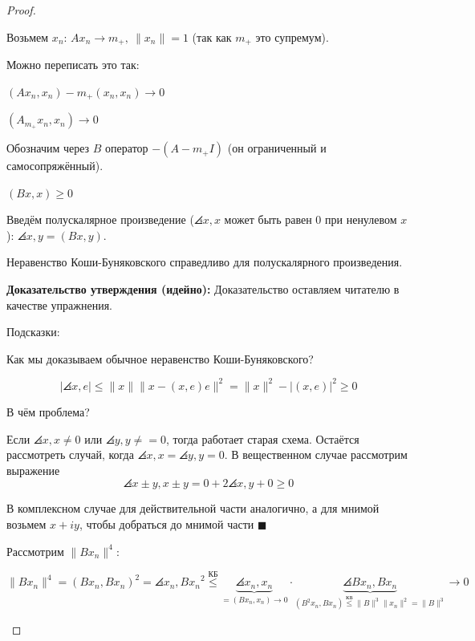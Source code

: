 \begin{proof}
\begin{itemize}
\begin{itemize}
            Возьмем $x_n$: $Ax_n \to m_+, \: \|x_n\| = 1$ (так как $m_+$ это супремум). 

            Можно переписать это так:
            
            $(A x_n, x_n) - m_+ (x_n, x_n) \to 0$

            $(A_{m_+} x_n, x_n) \to 0$

            Обозначим через $B$ оператор $-(A - m_+ I)$ (он ограниченный и самосопряжённый).

            $(Bx, x) \geqslant 0$

            Введём полускалярное произведение ($\angles{x, x}$ может быть равен 0 при ненулевом $x$): $\angles{x, y} = (Bx, y)$.

            \begin{statement}
                Неравенство Коши-Буняковского справедливо для полускалярного произведения.
                
            \end{statement}
            \textbf{Доказательство утверждения (идейно):} Доказательство оставляем читателю в качестве упражнения.

                Подсказки: 

                Как мы доказываем обычное неравенство Коши-Буняковского?

                \[
                |\angles{x, e}| \leqslant \|x\|
                \| x - (x, e) e\|^2 = \|x\|^2 - |(x, e)|^2 \geqslant 0
                \]

                В чём проблема?

                Если $\angles{x, x} \neq 0$ или $\angles{y, y} \neq = 0$, тогда работает старая схема. Остаётся рассмотреть случай, когда $\angles{x, x} = \angles{y, y} = 0$.
                В вещественном случае рассмотрим выражение 
                \[
                \angles{x \pm y, x \pm y} = 0 + 2 \angles{x, y} + 0
                \geqslant 0
                \]

                В комплексном случае для действительной части аналогично, а для мнимой возьмем $x+iy$, чтобы добраться до мнимой части $\blacksquare$
            
            
            Рассмотрим $\|Bx_n\|^4$: %

            \[
            \|Bx_n\|^4 = (Bx_n, Bx_n)^2 = \angles{x_n, B x_n}^2 \stackrel{\text{КБ}}{\leqslant}  
            \underbrace{\angles{x_n, x_n}}_{=(B x_n, x_n) \to 0} 
            \cdot \underbrace{\angles{B x_n, B x_n}}_{(B^2 x_n, B x_n)
            \stackrel{\text{КБ}}{\leqslant} \|B\|^3 \|x_n\|^2 = 
            \|B\|^3} \to 0
            \]

        \end{itemize}
  \end{itemize}
\end{proof}